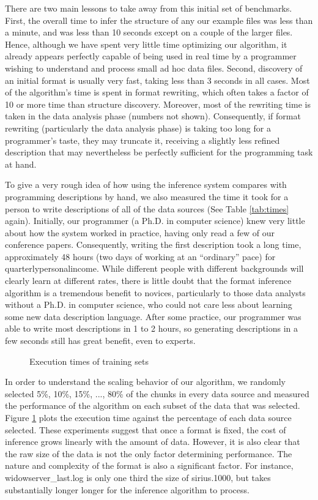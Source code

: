 There are two main lessons to take away from this initial set of
benchmarks.  First, the overall time to infer the structure of any our
example files was less than a minute, and was less than 10 seconds
except on a couple of the larger files.  Hence, although we have spent
very little time optimizing our algorithm, it already appears
perfectly capable of being used in real time by a programmer wishing
to understand and process small ad hoc data files.  Second, discovery
of an initial format is usually very fast, taking less than 3 seconds
in all cases.  Most of the algorithm's time is spent in format rewriting, which
often takes a factor of 10 or more time than structure discovery.  Moreover, most of the
rewriting time is taken in the data analysis phase (numbers not
shown).  Consequently, if format rewriting (particularly the data analysis phase)
is taking too long for a programmer's taste, they may truncate it, receiving a 
slightly less refined description that may nevertheless be perfectly sufficient
for the programming task at hand.

To give a very rough idea of how using the inference system compares with programming
descriptions by hand, we also measured the time it took for a person to write descriptions of
all of the data sources (See Table \ref{tab:times} again).  
Initially, our programmer (a Ph.D. in computer science)
knew very little about how the \pads{} system
worked in practice, having only read a few of our conference papers.  Consequently, writing
the first description took a long time, approximately 48 hours (two days of working at
an ``ordinary'' pace) for quarterlypersonalincome.  While different people with different 
backgrounds will clearly learn at different rates, there is little doubt that the
format inference algorithm is a tremendous benefit to novices, particularly
to those data analysts without a Ph.D. in computer science, who could not care less about
learning some new data description language.  After some practice, our programmer was
able to write most descriptions in 1 to 2 hours, so generating descriptions in a few
seconds still has great benefit, even to experts.

\begin{figure}
\caption{Execution times of training sets} \label{fig:traintime} \shrink
\end{figure}

In order to understand the scaling behavior of our algorithm, we
randomly selected 5\%, 10\%, 15\%, ..., 80\% of the chunks in every data source
and measured the performance of the algorithm on each subset of the data that was
selected. Figure \ref{fig:traintime}
plots the execution time against the percentage of each data source selected.
These experiments suggest that once a format is fixed, the cost of inference
grows linearly with the amount of data.  However, it is also clear that the raw
size of the data is not the only factor determining performance.  The nature and complexity
of the format is also a significant factor.  For instance, widowserver\_last.log
is only one third the size of sirius.1000, but takes substantially longer longer
for the inference algorithm to process.

